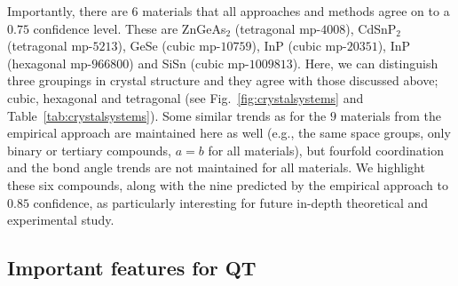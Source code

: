 \documentclass[superscriptaddress,unsortedaddress,
 amsmath,amssymb,
 aps,
]{revtex4-2}
\begin{document}
Importantly, there are $6$ materials that all approaches and methods agree on to a $0.75$ confidence level. These are ZnGeAs$_2$ (tetragonal mp-$4008$), CdSnP$_2$ (tetragonal mp-$5213$), GeSe (cubic mp-$10759$), InP (cubic mp-$20351$), InP (hexagonal mp-$966800$) and SiSn (cubic mp-$1009813$). Here, we can distinguish three groupings in crystal structure and they agree with those discussed above; cubic, hexagonal and tetragonal (see Fig.~\ref{fig:crystalsystems} and Table~\ref{tab:crystalsystems}).   
Some similar trends as for the $9$ materials from the empirical approach are maintained here as well (e.g., the same space groups, only binary or tertiary compounds, $a=b$ for all materials), but fourfold coordination and the bond angle trends are not maintained for all materials. 
We highlight these six compounds, along with the nine predicted by the empirical approach to $0.85$ confidence, as particularly interesting for future in-depth theoretical and experimental study. 

\subsection*{Important features for QT} 
\end{document}
